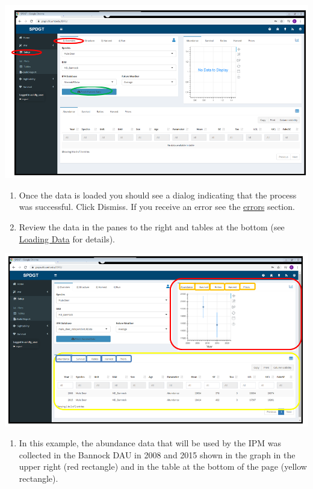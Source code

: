 \documentclass[
]{book}
\providecommand{\tightlist}{%
  \setlength{\itemsep}{0pt}\setlength{\parskip}{0pt}}
\begin{document}
\includegraphics{./www/ipm_02.PNG}

\begin{enumerate}
\def\labelenumi{\arabic{enumi}.}
\setcounter{enumi}{3}
\item
  Once the data is loaded you should see a dialog indicating that the process was successful. Click Dismiss. If you receive an error see the \protect\hyperlink{ipm-errors}{errors} section.
\item
  Review the data in the panes to the right and tables at the bottom (see \protect\hyperlink{ipm-load}{Loading Data} for details).
\end{enumerate}

\includegraphics{./www/ipm_03.PNG}

\begin{enumerate}
\def\labelenumi{\arabic{enumi}.}
\setcounter{enumi}{5}
\tightlist
\item
  In this example, the abundance data that will be used by the IPM was collected in the Bannock DAU in 2008 and 2015 shown in the graph in the upper right (red rectangle) and in the table at the bottom of the page (yellow rectangle).
\end{enumerate}
\end{document}
